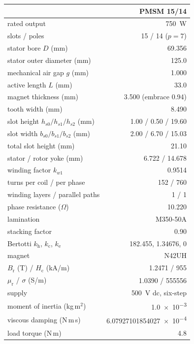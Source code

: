 \documentclass[10pt,a4paper,twocolumn]{article}
\newcommand{\murec}{\mu_{\mathrm{r}}}
\theoremstyle{plain}
\theoremstyle{remark}
\begin{document}
\begin{table}[!ht]
\centering
\begin{threeparttable}
\footnotesize
\begin{tabular}{@{}lr@{}}
\toprule
 & PMSM 15/14 \\
\midrule
rated output & \SI{750}{\watt} \\
slots / poles & 15 / 14 ($p=7$) \\
stator bore $D$ (mm) & 69.356 \\
stator outer diameter (mm) & 125.0 \\
mechanical air gap $g$ (mm) & 1.000 \\
active length $L$ (mm) & 33.0 \\
magnet thickness (mm) & 3.500 (embrace 0.94) \\
tooth width (mm) & 8.490 \\
slot height $h_{s0}/h_{s1}/h_{s2}$ (mm) & 1.00 / 0.50 / 19.60\tnote{a} \\
slot width $b_{s0}/b_{s1}/b_{s2}$ (mm) & 2.00 / 6.70 / 15.03 \\
total slot height (mm) & 21.10 \\
stator / rotor yoke (mm) & 6.722 / 14.678 \\
\midrule
winding factor $k_{w1}$ & 0.9514 \\
turns per coil / per phase & 152 / 760 \\
winding layers / parallel paths & 1 / 1 \\
phase resistance ($\Omega$) & 10.220 \\
lamination & M350-50A \\
stacking factor & 0.90 \\
Bertotti $k_{\mathrm{h}}$, $k_{\mathrm{c}}$, $k_{\mathrm{e}}$ & 182.455, 1.34676, 0\tnote{b} \\
magnet & N42UH \\
\quad $B_{\mathrm{r}}$ (T) / $H_{\mathrm{c}}$ (kA/m) & 1.2471 / 955 \\
\quad $\murec$ / $\sigma$ (S/m) & 1.0390 / \num{555556} \\
supply & \SI{500}{\volt} dc, six-step \\
\midrule
moment of inertia (kg\,m$^2$)\tnote{c} & \num{1.0e-3} \\
viscous damping (N\,m\,s) & \num{6.07927101854027e-4} \\
load torque (N\,m) & 4.8 \\
\bottomrule
\end{tabular}
\begin{tablenotes}[flushleft]\footnotesize

\end{tablenotes}
\end{threeparttable}
\end{table}
\end{document}
